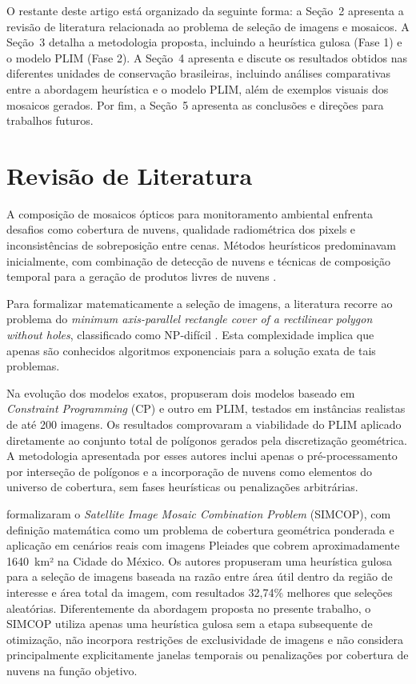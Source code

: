 \documentclass[a4paper,11pt]{article}
\begin{document}
O restante deste artigo está organizado da seguinte forma: a Seção~2 apresenta a revisão de literatura relacionada ao problema de seleção de imagens e mosaicos. A Seção~3 detalha a metodologia proposta, incluindo a heurística gulosa (Fase 1) e o modelo PLIM (Fase 2). A Seção~4 apresenta e discute os resultados obtidos nas diferentes unidades de conservação brasileiras, incluindo análises comparativas entre a abordagem heurística e o modelo PLIM, além de exemplos visuais dos mosaicos gerados. Por fim, a Seção~5 apresenta as conclusões e direções para trabalhos futuros.
\vspace{-6mm}
\section{Revisão de Literatura}
\vspace{-3mm}
A composição de mosaicos ópticos para monitoramento ambiental enfrenta desafios como cobertura de nuvens, qualidade radiométrica dos pixels e inconsistências de sobreposição entre cenas. Métodos heurísticos predominavam inicialmente, com combinação de detecção de nuvens e técnicas de composição temporal para a geração de produtos livres de nuvens \citep{kempeneers:2017}.

Para formalizar matematicamente a seleção de imagens, a literatura recorre ao problema do \emph{minimum axis-parallel rectangle cover of a rectilinear polygon without holes}, classificado como NP-difícil \citep{KumarRamesh1995, masek1978}. Esta complexidade implica que apenas são conhecidos algoritmos exponenciais para a solução exata de tais problemas. 

Na evolução dos modelos exatos, \citet{combarro-simon-constraint-2023} propuseram dois modelos baseado em \textit{Constraint Programming} (CP) e outro em PLIM, testados em instâncias realistas de até 200 imagens. Os resultados comprovaram a viabilidade do PLIM aplicado diretamente ao conjunto total de polígonos gerados pela discretização geométrica. A metodologia apresentada por esses autores inclui apenas o pré-processamento por interseção de polígonos e a incorporação de nuvens como elementos do universo de cobertura, sem fases heurísticas ou penalizações arbitrárias.

\citet{combarro-simon-simcop:2023} formalizaram o \textit{Satellite Image Mosaic Combination Problem} (SIMCOP), com definição matemática como um problema de cobertura geométrica ponderada e aplicação em cenários reais com imagens Pleiades que cobrem aproximadamente 1640~km² na Cidade do México. Os autores propuseram uma heurística gulosa para a seleção de imagens baseada na razão entre área útil dentro da região de interesse e área total da imagem, com resultados 32,74\% melhores que seleções aleatórias. Diferentemente da abordagem proposta no presente trabalho, o SIMCOP utiliza apenas uma heurística gulosa sem a etapa subsequente de otimização, não incorpora restrições de exclusividade de imagens e não considera principalmente explicitamente janelas temporais ou penalizações por cobertura de nuvens na função objetivo.
\end{document}
